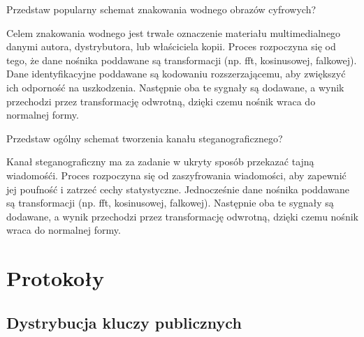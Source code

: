 \documentclass[answers,11pt]{exam}
\begin{document}
\begin{questions}
\question Przedstaw popularny schemat znakowania wodnego obrazów cyfrowych?
\begin{solution}
Celem znakowania wodnego jest trwałe oznaczenie materiału multimedialnego danymi autora, dystrybutora, lub właściciela kopii. Proces rozpoczyna się od tego, że dane nośnika poddawane są transformacji (np. fft, kosinusowej, falkowej). Dane identyfikacyjne poddawane są kodowaniu rozszerzającemu, aby zwiększyć ich odporność na uszkodzenia. Następnie oba te sygnały są dodawane, a wynik przechodzi przez transformację odwrotną, dzięki czemu nośnik wraca do normalnej formy.
\end{solution}

\question Przedstaw ogólny schemat tworzenia kanału steganograficznego?
\begin{solution}
Kanał steganograficzny ma za zadanie w ukryty sposób przekazać tajną wiadomośći. Proces rozpoczyna się od zaszyfrowania wiadomości, aby zapewnić jej poufność i zatrzeć cechy statystyczne. Jednocześnie dane nośnika poddawane są transformacji (np. fft, kosinusowej, falkowej). Następnie oba te sygnały są dodawane, a wynik przechodzi przez transformację odwrotną, dzięki czemu nośnik wraca do normalnej formy.
\end{solution}


\end{questions}



\section{Protokoły}

\subsection{Dystrybucja kluczy publicznych}
\end{document}
